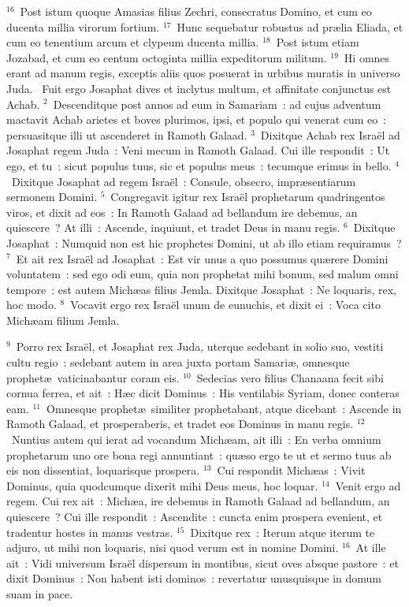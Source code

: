 ${}^{16}$~Post istum quoque Amasias filius Zechri, consecratus Domino, et cum eo ducenta millia virorum fortium.
${}^{17}$~Hunc sequebatur robustus ad pr\ae lia Eliada, et cum eo tenentium arcum et clypeum ducenta millia.
${}^{18}$~Post istum etiam Jozabad, et cum eo centum octoginta millia expeditorum militum.
${}^{19}$~Hi omnes erant ad manum regis, exceptis aliis quos posuerat in urbibus muratis in universo Juda.
~Fuit ergo Josaphat dives et inclytus multum, et affinitate conjunctus est Achab.
${}^{2}$~Descenditque post annos ad eum in Samariam~: ad cujus adventum mactavit Achab arietes et boves plurimos, ipsi, et populo qui venerat cum eo~: persuasitque illi ut ascenderet in Ramoth Galaad.
${}^{3}$~Dixitque Achab rex Isra\"el ad Josaphat regem Juda~: Veni mecum in Ramoth Galaad. Cui ille respondit~: Ut ego, et tu~: sicut populus tuus, sic et populus meus~: tecumque erimus in bello.
${}^{4}$~Dixitque Josaphat ad regem Isra\"el~: Consule, obsecro, impr\ae sentiarum sermonem Domini.
${}^{5}$~Congregavit igitur rex Isra\"el prophetarum quadringentos viros, et dixit ad eos~: In Ramoth Galaad ad bellandum ire debemus, an quiescere~? At illi~: Ascende, inquiunt, et tradet Deus in manu regis.
${}^{6}$~Dixitque Josaphat~: Numquid non est hic prophetes Domini, ut ab illo etiam requiramus~?
${}^{7}$~Et ait rex Isra\"el ad Josaphat~: Est vir unus a quo possumus qu\ae rere Domini voluntatem~: sed ego odi eum, quia non prophetat mihi bonum, sed malum omni tempore~: est autem Mich\ae as filius Jemla. Dixitque Josaphat~: Ne loquaris, rex, hoc modo.
${}^{8}$~Vocavit ergo rex Isra\"el unum de eunuchis, et dixit ei~: Voca cito Mich\ae am filium Jemla.


${}^{9}$~Porro rex Isra\"el, et Josaphat rex Juda, uterque sedebant in solio suo, vestiti cultu regio~: sedebant autem in area juxta portam Samari\ae , omnesque prophet\ae\ vaticinabantur coram eis.
${}^{10}$~Sedecias vero filius Chanaana fecit sibi cornua ferrea, et ait~: H\ae c dicit Dominus~: His ventilabis Syriam, donec conteras eam.
${}^{11}$~Omnesque prophet\ae\ similiter prophetabant, atque dicebant~: Ascende in Ramoth Galaad, et prosperaberis, et tradet eos Dominus in manu regis.
${}^{12}$~Nuntius autem qui ierat ad vocandum Mich\ae am, ait illi~: En verba omnium prophetarum uno ore bona regi annuntiant~: qu\ae so ergo te ut et sermo tuus ab eis non dissentiat, loquarisque prospera.
${}^{13}$~Cui respondit Mich\ae as~: Vivit Dominus, quia quodcumque dixerit mihi Deus meus, hoc loquar.
${}^{14}$~Venit ergo ad regem. Cui rex ait~: Mich\ae a, ire debemus in Ramoth Galaad ad bellandum, an quiescere~? Cui ille respondit~: Ascendite~: cuncta enim prospera evenient, et tradentur hostes in manus vestras.
${}^{15}$~Dixitque rex~: Iterum atque iterum te adjuro, ut mihi non loquaris, nisi quod verum est in nomine Domini.
${}^{16}$~At ille ait~: Vidi universum Isra\"el dispersum in montibus, sicut oves absque pastore~: et dixit Dominus~: Non habent isti dominos~: revertatur unusquisque in domum suam in pace.


